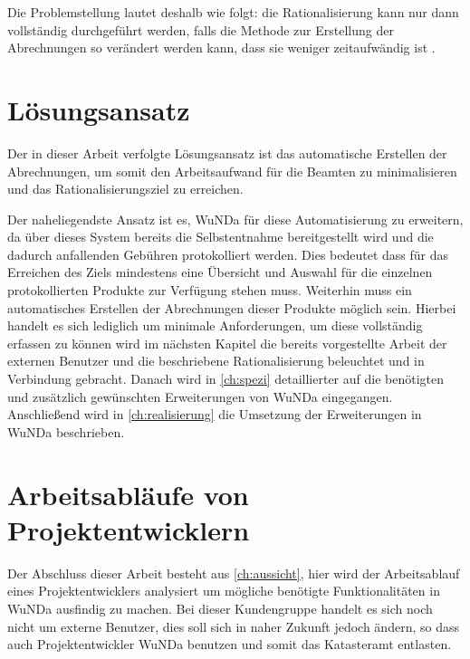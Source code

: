 Die Problemstellung lautet deshalb wie folgt: die Rationalisierung kann nur dann vollständig durchgeführt werden, falls die Methode zur Erstellung der Abrechnungen so verändert werden kann, dass sie weniger zeitaufwändig ist \autocite[vgl.][]{sander-abrechnung}. 


\section{Lösungsansatz}

Der in dieser Arbeit verfolgte Lösungsansatz ist das automatische Erstellen der Abrechnungen, um somit den Arbeitsaufwand für die Beamten zu minimalisieren und das Rationalisierungsziel zu erreichen. 

Der naheliegendste Ansatz ist es, \acs{WuNDa} für diese Automatisierung zu erweitern, da über dieses System bereits die Selbstentnahme bereitgestellt wird und die dadurch anfallenden Gebühren protokolliert werden.
Dies bedeutet dass für das Erreichen des Ziels mindestens eine Übersicht und Auswahl für die einzelnen protokollierten Produkte zur Verfügung stehen muss.
Weiterhin muss ein automatisches Erstellen der Abrechnungen dieser Produkte möglich sein.
Hierbei handelt es sich lediglich um minimale Anforderungen, um diese vollständig erfassen zu können wird im nächsten Kapitel die bereits vorgestellte Arbeit der externen Benutzer und die beschriebene Rationalisierung beleuchtet und in Verbindung gebracht.
Danach wird in \autoref{ch:spezi} detaillierter auf die benötigten und zusätzlich gewünschten Erweiterungen von \ac{WuNDa} eingegangen.
Anschließend wird in \autoref{ch:realisierung} die Umsetzung der Erweiterungen in \ac{WuNDa} beschrieben.

\section{Arbeitsabläufe von Projektentwicklern}
Der Abschluss dieser Arbeit besteht aus \autoref{ch:aussicht}, hier wird der Arbeitsablauf eines Projektentwicklers analysiert um mögliche benötigte Funktionalitäten in \ac{WuNDa} ausfindig zu machen.
Bei dieser Kundengruppe handelt es sich noch nicht um externe Benutzer, dies soll sich in naher Zukunft jedoch ändern, so dass auch Projektentwickler \ac{WuNDa} benutzen und somit das Katasteramt entlasten.


